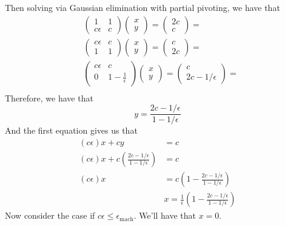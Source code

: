 \documentclass{article}
\begin{document}
Then solving via Gaussian elimination with partial pivoting, we have that 
\begin{align*}
    &\begin{pmatrix}
        1&1\\
        c\epsilon&c
    \end{pmatrix}\begin{pmatrix}
        x\\y
    \end{pmatrix}=
    \begin{pmatrix}
        2c\\c
    \end{pmatrix}=\\
    &\begin{pmatrix}
        c\epsilon&c\\
        1&1
    \end{pmatrix}\begin{pmatrix}
        x\\y
    \end{pmatrix}=
    \begin{pmatrix}
        c\\2c
    \end{pmatrix}=\\
    &\begin{pmatrix}
        c\epsilon & c\\
        0 &1-\frac{1}{\epsilon}
    \end{pmatrix}\begin{pmatrix}
        x\\y
    \end{pmatrix} = 
    \begin{pmatrix}
        c\\
        2c-1/\epsilon
    \end{pmatrix}=\\
\end{align*}
Therefore, we have that
\begin{equation*}
    y=\frac{2c-1/\epsilon}{1-1/\epsilon}
\end{equation*}
And the first equation gives us that  
\begin{align*}
    (c\epsilon)x+cy&=c \\
    \left(c\epsilon\right)x+c\left(\frac{2c-1/\epsilon}{1-1/\epsilon}\right) &= c\\
    \left(c\epsilon\right)x &= c\left(1-\frac{2c-1/\epsilon}{1-1/\epsilon}\right)\\
    &x=\frac{1}{\epsilon}\left(1-\frac{2c-1/\epsilon}{1-1/\epsilon}\right)
\end{align*}
Now consider the case if $c \epsilon \leq \epsilon_{\text{mach}}$. We'll have that $x=0$.\\
\end{document}

